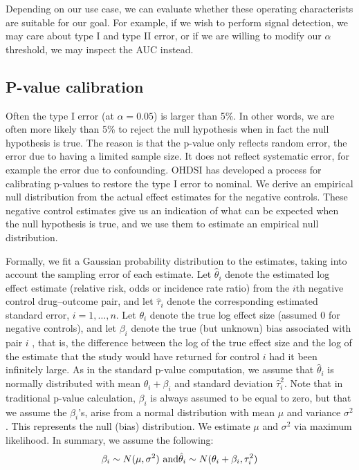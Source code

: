 \documentclass[11pt]{book}
\begin{document}
Depending on our use case, we can evaluate whether these operating
characterists are suitable for our goal. For example, if we wish to
perform signal detection, we may care about type I and type II error, or
if we are willing to modify our \(\alpha\) threshold, we may inspect the
AUC instead.

\subsection{P-value calibration}\label{p-value-calibration}

Often the type I error (at \(\alpha = 0.05\)) is larger than 5\%. In
other words, we are often more likely than 5\% to reject the null
hypothesis when in fact the null hypothesis is true. The reason is that
the p-value only reflects random error, the error due to having a
limited sample size. It does not reflect systematic error, for example
the error due to confounding. OHDSI has developed a process for
calibrating p-values to restore the type I error to nominal.
\citep{schuemie_2014} We derive an empirical null distribution from the
actual effect estimates for the negative controls. These negative
control estimates give us an indication of what can be expected when the
null hypothesis is true, and we use them to estimate an empirical null
distribution.

Formally, we fit a Gaussian probability distribution to the estimates,
taking into account the sampling error of each estimate. Let
\(\hat{\theta}_i\) denote the estimated log effect estimate (relative
risk, odds or incidence rate ratio) from the \(i\)th negative control
drug--outcome pair, and let \(\hat{\tau}_i\) denote the corresponding
estimated standard error, \(i=1,\ldots,n\). Let \(\theta_i\) denote the
true log effect size (assumed 0 for negative controls), and let
\(\beta_i\) denote the true (but unknown) bias associated with pair
\(i\) , that is, the difference between the log of the true effect size
and the log of the estimate that the study would have returned for
control \(i\) had it been infinitely large. As in the standard p-value
computation, we assume that \(\hat{\theta}_i\) is normally distributed
with mean \(\theta_i + \beta_i\) and standard deviation
\(\hat{\tau}_i^2\). Note that in traditional p-value calculation,
\(\beta_i\) is always assumed to be equal to zero, but that we assume
the \(\beta_i\)'s, arise from a normal distribution with mean \(\mu\)
and variance \(\sigma^2\). This represents the null (bias) distribution.
We estimate \(\mu\) and \(\sigma^2\) via maximum likelihood. In summary,
we assume the following:
\[\beta_i \sim N(\mu,\sigma^2) \text{  and} \\ \hat{\theta}_i \sim N(\theta_i + \beta_i, \tau_i^2)\]
\end{document}
